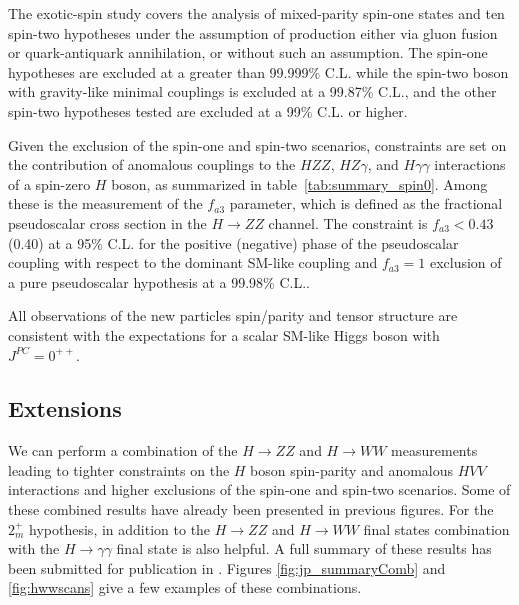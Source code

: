 The exotic-spin study covers the analysis of mixed-parity spin-one states and ten spin-two hypotheses
under the assumption of production either via gluon fusion or quark-antiquark annihilation, or without
such an assumption. The spin-one hypotheses are excluded at a greater than 99.999\% C.L. while the spin-two boson with gravity-like minimal couplings is excluded at a 99.87\% C.L., and the other
spin-two hypotheses tested are excluded at a 99\% C.L. or higher.

Given the exclusion of the spin-one and spin-two scenarios,
constraints are set on the contribution of anomalous couplings to the
$HZZ$, $HZ\gamma$, and $H\gamma\gamma$ interactions
of a spin-zero $H$ boson, as summarized in table~\ref{tab:summary_spin0}.
Among these is the measurement of the $f_{a3}$ parameter,
which is defined as the fractional pseudoscalar cross section in the $H\to ZZ$ channel.
The constraint is $f_{a3}<0.43$ (0.40) at a 95\% C.L. for the positive (negative)
phase of the pseudoscalar coupling with respect to the dominant SM-like coupling
and $f_{a3}=1$ exclusion of a pure pseudoscalar hypothesis at a 99.98\% C.L..

All observations of the new particles spin/parity and tensor structure are consistent with the expectations for a scalar SM-like Higgs boson with $J^{PC} = 0^{++}$.

\subsection{Extensions}

We can perform a combination of the $H\to ZZ$ and $H \to WW$ measurements leading to tighter constraints on the $H$ boson spin-parity and anomalous $HVV$ interactions and higher exclusions of the spin-one and spin-two scenarios. Some of these combined results have already been presented in previous figures. For the $2_{m}^{+}$ hypothesis, in addition to the $H \to ZZ$ and $H \to WW$ final states combination with the $H \to \gamma\gamma$ final state is also helpful. A full summary of these results has been submitted for publication in \cite{Khachatryan:2014kca}. Figures \ref{fig:jp_summaryComb} and \ref{fig:hwwscans} give a few examples of these combinations.

